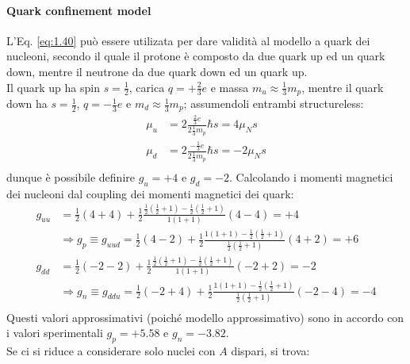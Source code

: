 \paragraph{Quark confinement model}

L'Eq. \ref{eq:1.40} può essere utilizata per dare validità al modello a quark dei nucleoni, secondo il quale il protone è composto da due quark up ed un quark down, mentre il neutrone da due quark down ed un quark up.\\
Il quark up ha spin $ s = \frac{1}{2} $, carica $ q = +\frac{2}{3}e $ e massa $ m_u \approx \frac{1}{3}m_p $, mentre il quark down ha $ s = \frac{1}{2} $, $ q = -\frac{1}{3}e $ e $ m_d \approx \frac{1}{3}m_p $; assumendoli entrambi structureless:
\begin{align*}
	\mu_u &= 2 \frac{\frac{2}{3} e}{2 \frac{1}{3}m_p} \hbar s = 4 \mu_N s \\
	\mu_d &= 2 \frac{-\frac{1}{3} e}{2 \frac{1}{3}m_p} \hbar s = -2 \mu_N s \\
\end{align*}
dunque è possibile definire $ g_u = +4 $ e $ g_d = -2 $. Calcolando i momenti magnetici dei nucleoni dal coupling dei momenti magnetici dei quark:
\begin{equation*}
	\begin{split}
		g_{uu} &= \frac{1}{2} (4 + 4) + \frac{1}{2} \frac{\frac{1}{2} \left( \frac{1}{2} + 1 \right) - \frac{1}{2} \left( \frac{1}{2} + 1 \right)}{1 (1 + 1)} \left( 4 - 4 \right) = +4\\
		       &\Longrightarrow g_p \equiv g_{uud} = \frac{1}{2} (4 - 2) + \frac{1}{2} \frac{1 \left( 1 + 1 \right) - \frac{1}{2} \left( \frac{1}{2} + 1 \right)}{\frac{1}{2} \left( \frac{1}{2} + 1 \right)} (4 + 2) = +6\\
		g_{dd} &= \frac{1}{2} (-2 -2) + \frac{1}{2} \frac{\frac{1}{2} \left( \frac{1}{2} + 1 \right) - \frac{1}{2} \left( \frac{1}{2} + 1 \right)}{1 (1 + 1)} \left( -2 +2 \right) = -2\\
		       &\Longrightarrow g_n \equiv g_{ddu} = \frac{1}{2} (-2 + 4) + \frac{1}{2} \frac{1 \left( 1 + 1 \right) - \frac{1}{2} \left( \frac{1}{2} + 1 \right)}{\frac{1}{2} \left( \frac{1}{2} + 1 \right)} (-2 -4) = -4\\
	\end{split}
\end{equation*}
Questi valori approssimativi (poiché modello approssimativo) sono in accordo con i valori sperimentali $ g_p = +5.58 $ e $ g_n = -3.82 $.\\
Se ci si riduce a considerare solo nuclei con $ A $ dispari, si trova:
